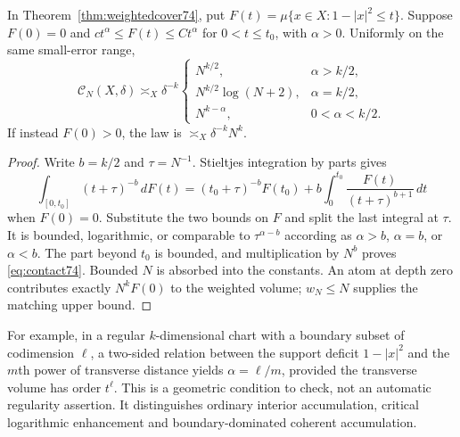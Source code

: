 \begin{corollary}\label{cor:contact74}
In Theorem~\ref{thm:weightedcover74}, put
$F(t)=\mu\{x\in X:1-|x|^2\le t\}$. Suppose $F(0)=0$ and
$c t^\alpha\le F(t)\le C t^\alpha$ for $0<t\le t_0$, with
$\alpha>0$. Uniformly on the same small-error range,
\begin{equation}\label{eq:contact74}
 \mathcal C_N(X,\delta)\asymp_X\delta^{-k}
 \begin{cases}
 N^{k/2},&\alpha>k/2,\\
 N^{k/2}\log(N+2),&\alpha=k/2,\\
 N^{k-\alpha},&0<\alpha<k/2.
 \end{cases}
\end{equation}
If instead $F(0)>0$, the law is $\asymp_X\delta^{-k}N^k$.
\end{corollary}
\begin{proof}
Write $b=k/2$ and $\tau=N^{-1}$. Stieltjes integration by parts gives
\[
 \int_{[0,t_0]}(t+\tau)^{-b}\,dF(t)
 =(t_0+\tau)^{-b}F(t_0)
       +b\int_0^{t_0}\frac{F(t)}{(t+\tau)^{b+1}}\,dt
\]
when $F(0)=0$. Substitute the two bounds on $F$ and split the last
integral at $\tau$. It is bounded, logarithmic, or comparable to
$\tau^{\alpha-b}$ according as $\alpha>b$, $\alpha=b$, or
$\alpha<b$. The part beyond $t_0$ is bounded, and multiplication by
$N^b$ proves \eqref{eq:contact74}. Bounded $N$ is absorbed into the
constants. An atom at depth zero contributes exactly $N^kF(0)$ to
the weighted volume; $w_N\le N$ supplies the matching upper bound.
\end{proof}
For example, in a regular $k$-dimensional chart with a boundary subset
of codimension $\ell$, a two-sided relation between the support deficit
$1-|x|^2$ and the $m$th power of transverse distance yields
$\alpha=\ell/m$, provided the transverse volume has order $t^\ell$.
This is a geometric condition to check, not an automatic regularity
assertion. It distinguishes ordinary interior accumulation, critical
logarithmic enhancement and boundary-dominated coherent accumulation.

